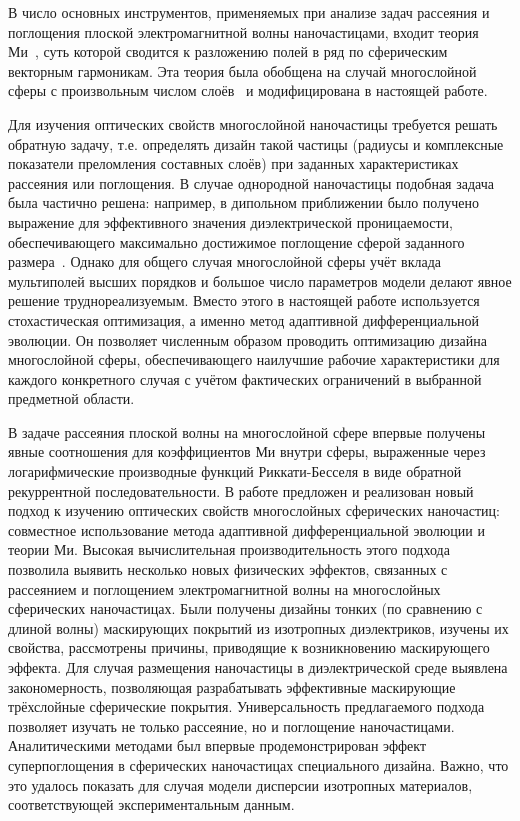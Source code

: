 {\methods} В число основных инструментов, применяемых при анализе задач
рассеяния и поглощения плоской электромагнитной волны наночастицами,
входит теория Ми~\cite{Mie-1908}, суть которой
сводится к разложению полей в ряд по сферическим векторным
гармоникам. Эта теория была обобщена на случай многослойной сферы с
произвольным числом слоёв~\cite{Yang-2003, Pena-scattnlay-2009} и
модифицирована в настоящей работе. %

Для изучения оптических свойств многослойной наночастицы требуется
решать обратную задачу, т.е. определять дизайн такой частицы
(радиусы и комплексные показатели преломления составных слоёв) при
заданных характеристиках рассеяния или поглощения. В случае однородной
наночастицы подобная задача была частично решена: например, в дипольном
приближении было получено выражение для эффективного значения
диэлектрической проницаемости, обеспечивающего максимально достижимое
поглощение сферой заданного
размера~\cite{Grigoriev-2015}. Однако для общего случая многослойной
сферы учёт вклада мультиполей высших порядков и большое число
параметров модели делают явное решение труднореализуемым. Вместо этого
в настоящей работе используется стохастическая оптимизация, а
именно метод адаптивной дифференциальной эволюции. Он позволяет
численным образом проводить оптимизацию дизайна многослойной сферы,
обеспечивающего наилучшие рабочие характеристики для каждого
конкретного случая с учётом фактических ограничений в выбранной
предметной области.

{\novelty} В задаче рассеяния плоской волны на многослойной сфере
впервые получены явные соотношения для коэффициентов Ми внутри сферы,
выраженные через логарифмические производные функций Риккати-Бесселя в
виде обратной рекуррентной последовательности. В работе предложен и
реализован новый подход к изучению оптических свойств многослойных
сферических наночастиц: совместное использование метода адаптивной
дифференциальной эволюции и теории Ми.  Высокая вычислительная
производительность этого подхода позволила выявить несколько новых
физических эффектов, связанных с рассеянием и поглощением
электромагнитной волны на многослойных сферических наночастицах. Были
получены дизайны тонких (по сравнению с длиной волны) маскирующих
покрытий из изотропных диэлектриков, изучены их свойства, рассмотрены
причины, приводящие к возникновению маскирующего эффекта. Для случая
размещения наночастицы в диэлектрической среде выявлена
закономерность, позволяющая разрабатывать эффективные маскирующие
трёхслойные сферические покрытия.  Универсальность предлагаемого
подхода позволяет изучать не только рассеяние, но и поглощение
наночастицами. Аналитическими методами был впервые продемонстрирован
эффект суперпоглощения в сферических наночастицах специального
дизайна. Важно, что это удалось показать для случая модели дисперсии изотропных
материалов, соответствующей экспериментальным
данным.

